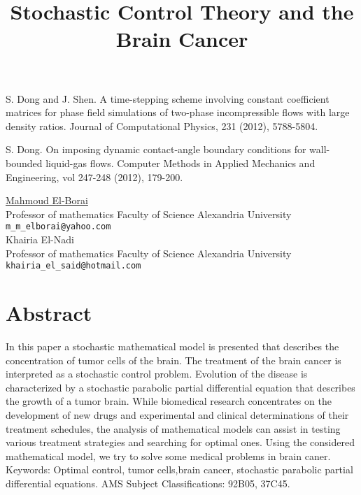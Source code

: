 \documentclass[article,A4,11pt]{llncs}%
\begin{document}

\begin{thebibliography}{10}
{\sc S. Dong and J. Shen}. {A time-stepping scheme involving constant coefficient matrices for phase field simulations of two-phase incompressible flows with large density ratios}. Journal of Computational Physics, 231 (2012), 5788-5804.

{\sc S. Dong}. {On imposing dynamic contact-angle boundary conditions for wall-bounded liquid-gas flows}. Computer Methods in Applied Mechanics and Engineering, vol 247-248 (2012), 179-200.
\end{thebibliography}

\title{Stochastic Control Theory and the Brain Cancer}
 \author{} \institute{}
\maketitle
\begin{center}
{\large \underline{Mahmoud El-Borai}}\\
Professor of mathematics Faculty of Science Alexandria University\\
{\tt \tt m\_m\_elborai@yahoo.com}
\\ \vspace{4mm}
{\large Khairia El-Nadi}\\
Professor of mathematics Faculty of Science Alexandria University\\
{\tt \tt khairia\_el\_said@hotmail.com}
\end{center}

\section*{Abstract}

 In this paper a stochastic mathematical model is presented that describes the concentration of tumor cells of the brain. The treatment of the brain cancer is interpreted as a stochastic  control problem. Evolution of the disease is characterized by a stochastic parabolic partial differential equation that describes the growth of a tumor brain.
While biomedical research concentrates on the development of new drugs and experimental and clinical determinations of their treatment schedules, the analysis of mathematical models can assist in testing various treatment strategies and searching for optimal ones.
Using the considered mathematical model, we try to solve some medical problems in brain caner.
Keywords: Optimal control, tumor cells,brain cancer, stochastic parabolic partial differential equations.
AMS Subject Classifications: 92B05, 37C45.
\end{document}
